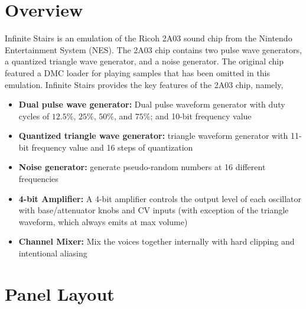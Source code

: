 \documentclass[12pt,letter]{article}
\begin{document}


\section{Overview}

Infinite Stairs is an emulation of the Ricoh 2A03 sound chip from the Nintendo Entertainment System (NES). The 2A03 chip contains two pulse wave generators, a quantized triangle wave generator, and a noise generator. The original chip featured a DMC loader for playing samples that has been omitted in this emulation. Infinite Stairs provides the key features of the 2A03 chip, namely,
\begin{itemize}
  \item \textbf{Dual pulse wave generator:} Dual pulse waveform generator with duty cycles of $12.5\%$, $25\%$, $50\%$, and $75\%$; and 10-bit frequency value
  \item \textbf{Quantized triangle wave generator:} triangle waveform generator with 11-bit frequency value and 16 steps of quantization
  \item \textbf{Noise generator:} generate pseudo-random numbers at 16 different frequencies
  \item \textbf{4-bit Amplifier:} A 4-bit amplifier controls the output level of each oscillator with base/attenuator knobs and CV inputs (with exception of the triangle waveform, which always emits at max volume)
  \item \textbf{Channel Mixer:} Mix the voices together internally with hard clipping and intentional aliasing
\end{itemize}


\clearpage
\section{Panel Layout}
\end{document}
